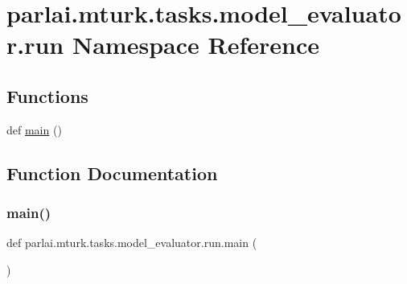 \hypertarget{namespaceparlai_1_1mturk_1_1tasks_1_1model__evaluator_1_1run}{}\section{parlai.\+mturk.\+tasks.\+model\+\_\+evaluator.\+run Namespace Reference}
\label{namespaceparlai_1_1mturk_1_1tasks_1_1model__evaluator_1_1run}
\subsection*{Functions}
\begin{DoxyCompactItemize}
\item 
def \hyperlink{namespaceparlai_1_1mturk_1_1tasks_1_1model__evaluator_1_1run_a0884addf15be92fa845f1fd80d057184}{main} ()
\end{DoxyCompactItemize}


\subsection{Function Documentation}
\mbox{\label{namespaceparlai_1_1mturk_1_1tasks_1_1model__evaluator_1_1run_a0884addf15be92fa845f1fd80d057184}} 
\subsubsection{\texorpdfstring{main()}{main()}}
{\footnotesize\ttfamily def parlai.\+mturk.\+tasks.\+model\+\_\+evaluator.\+run.\+main (\begin{DoxyParamCaption}{ }\end{DoxyParamCaption})}

